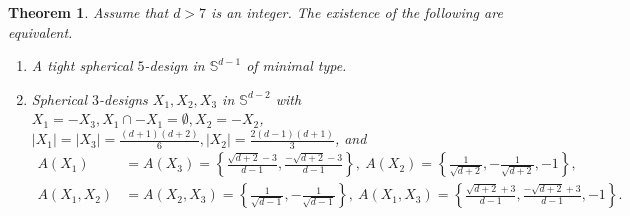 \documentclass[11pt]{article}
\newtheorem{theorem}{Theorem}[section]
\theoremstyle{definition}
\theoremstyle{remark}
\begin{document}
\begin{theorem}\label{thm:cc}
Assume that $d>7$ is an integer. The existence of the following are equivalent.
\begin{enumerate}
\item[{\rm (i)}] A tight spherical $5$-design in $\mathbb{S}^{d-1}$ of minimal type. 
\item[{\rm (ii)}] Spherical $3$-designs $X_1,X_2,X_3$ in $\mathbb{S}^{d-2}$ with $X_1=-X_3,X_1\cap -X_1=\emptyset, X_2=-X_2$, $|X_1|=|X_3|=\frac{(d+1)(d+2)}{6}, |X_2|=\frac{2(d-1)(d+1)}{3}$, and 
\begin{align*}
A(X_1)&=A(X_3)=\left\{\frac{\sqrt{d+2}-3}{d-1},\frac{-\sqrt{d+2}-3}{d-1}\right\},\ A(X_2)=\left\{\frac{1}{\sqrt{d+2}},-\frac{1}{\sqrt{d+2}},-1\right\},\\
A(X_1,X_2)&=A(X_2,X_3)=\left\{\frac{1}{\sqrt{d-1}},-\frac{1}{\sqrt{d-1}}\right\},\ A(X_1,X_3)=\left\{\frac{\sqrt{d+2}+3}{d-1},\frac{-\sqrt{d+2}+3}{d-1},-1\right\}. 
\end{align*}


\end{enumerate}
\end{theorem}
\end{document}
